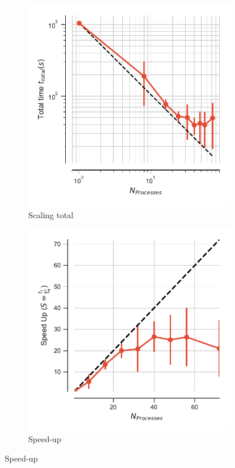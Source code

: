 \begin{figure}[ht!]
\centering
\begin{subfigure}{.4\textwidth}
  \includegraphics[width=\linewidth]{figures/RMSD-ga4py-t_total.pdf}
  \caption{Scaling total}
  \label{fig:MPIscaling-ga4py}
\end{subfigure}
\hfill
\begin{subfigure}{.4\textwidth}
  \includegraphics[width=\linewidth]{figures/RMSD-ga4py-speed_up.pdf}
  \caption{Speed-up}
  \label{fig:MPIspeedup-ga4py}
\end{subfigure}
\bigskip


\end{figure}
